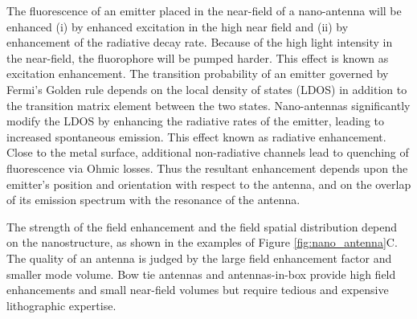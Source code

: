 The fluorescence of an emitter placed in the near-field of a nano-antenna will be enhanced (i) by enhanced excitation in the high near field and (ii) by enhancement of the radiative decay rate.
Because of the high light intensity in the near-field, the fluorophore will be pumped harder. This effect is known as excitation enhancement.
The transition probability of an emitter governed by Fermi's Golden rule depends on the local density of states (LDOS) in addition to the transition matrix element between the two states.
Nano-antennas significantly modify the LDOS by enhancing the radiative rates of the emitter, leading to increased spontaneous emission. This effect known as radiative enhancement.
Close to the metal surface, additional non-radiative channels lead to quenching of fluorescence via Ohmic losses.
Thus the resultant enhancement depends upon the emitter's position and orientation with respect to the antenna, and on the overlap of its emission spectrum with the resonance of the antenna.\cite{anger2006enhancement,khatua2014resonant}

The strength of the field enhancement and the field spatial distribution depend on the nanostructure, as shown in the examples of Figure \ref{fig:nano_antenna}C.
The quality of an antenna is judged by the large field enhancement factor and smaller mode volume.
Bow tie antennas and antennas-in-box provide high field enhancements and small near-field volumes but require tedious and expensive lithographic expertise.\cite{novotny2011antennas,regmi2017thesis}


